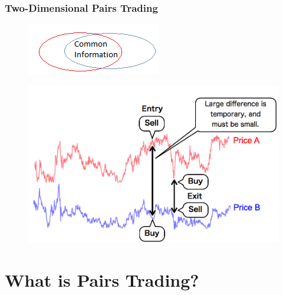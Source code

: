 \documentclass[pdf,9pt,xcolor=dvipsnames,hide notes]{beamer}
\begin{document}
	\begin{frame}
		\frametitle{Two-Dimensional Pairs Trading}
		
		\begin{figure}[htbp]
			\centering
			\includegraphics[scale=0.5]{fig1.png}
			\label{fig:fig1}
		\end{figure}
		
		\begin{figure}[htbp]
			\centering
			\includegraphics[scale=0.38]{fig2.png}
			\label{fig:fig2}
		\end{figure}
		
	\end{frame}
	
	\section{What is Pairs Trading?}
	
\end{document}
